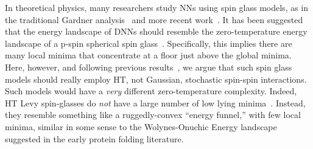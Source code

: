 In theoretical physics, many researchers study NNs using spin glass models, as in the traditional Gardner analysis~\cite{GD89,EB01_BOOK} and more recent work~\cite{PSG17_TR,PSG18_TR}.
It has been 
suggested that the energy landscape of DNNs should resemble the zero-temperature energy landscape of a p-spin spherical spin glass~\cite{CHMAx14_TR}.
Specifically, 
this 
implies 
there are many local minima that concentrate at a floor just above the global minima. 
Here, however, and following previous results~\cite{MM18_TR,MM19_HTSR_ICML}, we argue that such spin glass models should really employ HT, not Gaussian, stochastic spin-spin interactions.
Such models would have a \emph{very} different zero-temperature complexity. 
Indeed, HT Levy spin-glasses do \emph{not} have a large number of low lying minima~\cite{CB93,galluccio1998,GabKon99}.
Instead, they resemble something like a ruggedly-convex ``energy funnel,'' with few local minima, similar in some sense to the Wolynes-Onuchic Energy landscape \cite{wolynes_proteins_95,wolynes_arpc_97} suggested in the early protein folding literature.




